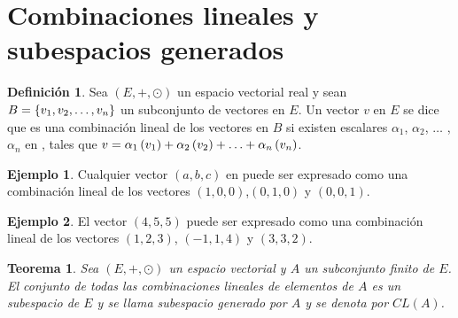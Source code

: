 \documentclass[10pt,a4paper]{report}
\newtheorem{theorem}{Teorema}[chapter]
\theoremstyle{definition}
\newtheorem{dfn}{Definición}[chapter]
\newtheorem{ejemplo}{Ejemplo}[chapter]
\theoremstyle{remark}
\numberwithin{section}{chapter}
\numberwithin{equation}{chapter}
\numberwithin{tacounter}{chapter}
\begin{document}
\section{Combinaciones lineales y subespacios generados}
\begin{dfn}
Sea $(E, +, \odot)$ un espacio vectorial real y sean $B= \lbrace v_1, v_2, \ldots, v_n \rbrace$ un subconjunto de vectores en $E$. Un vector $v$ en $E$ se dice que es una combinación lineal de los vectores en $B$ si existen escalares $\alpha_1$, $\alpha_2$, $\ldots$ , $\alpha_n$ en \dobler , tales que $v= \alpha_1\left(v_1\right)  +  \alpha_2\left(v_2\right)  + \ldots +  \alpha_n\left(v_n\right) $.

\end{dfn}

\begin{ejemplo}
Cualquier vector $(a, b, c)$ en \rtres puede ser expresado como una combinación lineal de los vectores  $(1,0,0)$,$(0,1,0)$ y $(0,0,1)$.

\end{ejemplo}

\begin{ejemplo}
El vector $(4,5,5)$ puede ser expresado como una combinación lineal de los vectores $(1,2,3)$, $(-1,1,4)$ y $(3,3,2)$.
\end{ejemplo}

\begin{theorem}
Sea $(E, +, \odot)$ un espacio vectorial y $A$ un subconjunto finito de $E$. El conjunto de todas las combinaciones lineales de elementos de $A$ es un subespacio de $E$ y se llama subespacio generado por $A$ y se denota por $CL(A)$.
\end{theorem}
\end{document}
